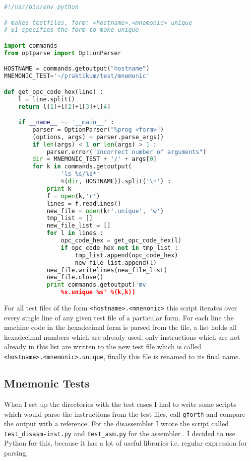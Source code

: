 \begin{lstlisting}[float, language=python, caption=Script: make\_unique.py, 
label=suni]
#!/usr/bin/env python

# makes testfiles, form: <hostname>.<mnemonic> unique
# $1 specifies the form to make unique

import commands
from optparse import OptionParser

HOSTNAME = commands.getoutput("hostname")
MNEMONIC_TEST='~/praktikum/test/mnemonic'

def get_opc_code_hex(line) :
    l = line.split()
    return l[1]+l[2]+l[3]+l[4]

    if __name__ == '__main__' :
        parser = OptionParser("%prog <form>")
        (options, args) = parser.parse_args()
        if len(args) < 1 or len(args) > 1 :
            parser.error("incorrect number of arguments")
        dir = MNEMONIC_TEST + '/' + args[0]
        for k in commands.getoutput(
                'ls %s/%s*'
                %(dir, HOSTNAME)).split('\n') :
            print k
            f = open(k,'r')
            lines = f.readlines()
            new_file = open(k+'.unique', 'w') 
            tmp_list = []
            new_file_list = []
            for l in lines :
                opc_code_hex = get_opc_code_hex(l)
                if opc_code_hex not in tmp_list :
                    tmp_list.append(opc_code_hex)
                    new_file_list.append(l)
            new_file.writelines(new_file_list)
            new_file.close()
            print commands.getoutput('mv 
                %s.unique %s' %(k,k))
\end{lstlisting}

For all test files of the form \texttt{<hostname>.<mnenonic>} this script 
iterates over every single line of any given test file of a particular form. 
For each line the machine code in the hexadecimal form is parsed from the file,
a list holds all hexadecimal numbers which are already used,
only instructions which are not already in this list are written to the new
test file which is called \\\texttt{<hostname>.<mnemonic>.unique}, finally this
file is renamed to its final name.

\subsection{Mnemonic Tests}

When I set up the directories with the test cases I had to write some scripts
which would parse the instructions from the test files, call \texttt{gforth} and
compare the output with a reference. For the disassembler I wrote the script
called \texttt{test\_disasm-inst.py} and \texttt{test\_asm.py} for the 
assembler . I decided to use Python for this, because it has a lot of useful 
libraries i.e. regular expression for parsing.

